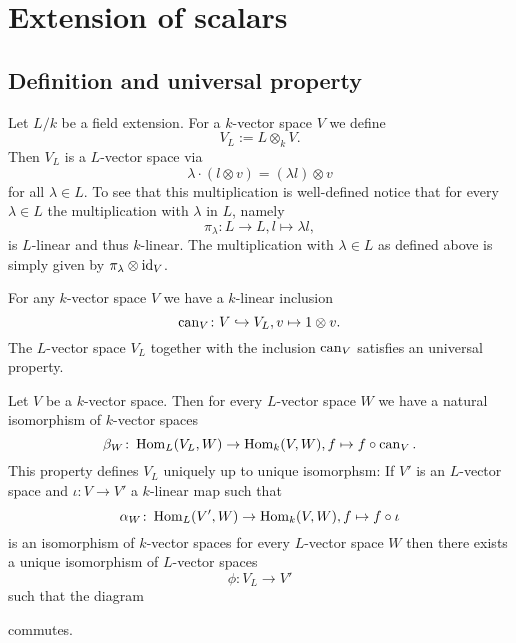 \appendix
\appendixpage
\addappheadtotoc





\chapter{Extension of scalars}





\section{Definition and universal property}


Let $L/k$ be a field extension. For a $k$-vector space $V$ we define
\[
 V_L := L \otimes_k V.
\]
Then $V_L$ is a $L$-vector space via
\[
 \lambda \cdot (l \otimes v) = (\lambda l) \otimes v
\]
for all $\lambda \in L$. To see that this multiplication is well-defined notice that for every $\lambda \in L$ the multiplication with $\lambda$ in $L$, namely
\[
 \pi_\lambda \colon L \to L, l \mapsto \lambda l,
\]
is $L$-linear and thus $k$-linear. The multiplication with $\lambda \in L$ as defined above is simply given by $\pi_\lambda \otimes \operatorname{id}_V$.

For any $k$-vector space $V$ we have a $k$-linear inclusion
\[
 \operatorname{can}_V \colon V \hookrightarrow V_L, v \mapsto 1 \otimes v.
\]
The $L$-vector space $V_L$ together with the inclusion $\operatorname{can}_V$ satisfies an universal property.


\begin{thrm}
 Let $V$ be a $k$-vector space. Then for every $L$-vector space $W$ we have a natural isomorphism of $k$-vector spaces
 \[
  \beta_W \colon \operatorname{Hom}_L(V_L, W) \to \operatorname{Hom}_k(V,W), f \mapsto f \circ \operatorname{can}_V.
 \]
 This property defines $V_L$ uniquely up to unique isomorphsm: If $V'$ is an $L$-vector space and $\iota \colon V \to V'$ a $k$-linear map such that
 \[
  \alpha_W \colon \operatorname{Hom}_L(V', W) \to \operatorname{Hom}_k(V,W), f \mapsto f \circ \iota
 \]
 is an isomorphism of $k$-vector spaces for every $L$-vector space $W$ then there exists a unique isomorphism of $L$-vector spaces
 \[
  \phi \colon V_L \to V'
 \]
 such that the diagram
 \begin{center}
 \end{center}
 commutes.
\end{thrm}


